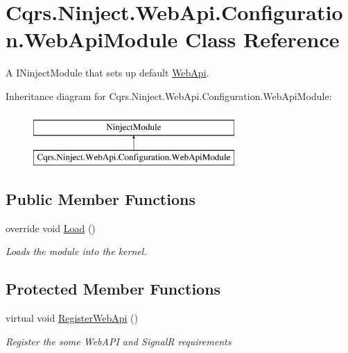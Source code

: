 \hypertarget{classCqrs_1_1Ninject_1_1WebApi_1_1Configuration_1_1WebApiModule}{}\section{Cqrs.\+Ninject.\+Web\+Api.\+Configuration.\+Web\+Api\+Module Class Reference}
\label{classCqrs_1_1Ninject_1_1WebApi_1_1Configuration_1_1WebApiModule}


A I\+Ninject\+Module that sets up default \hyperlink{namespaceCqrs_1_1Ninject_1_1WebApi}{Web\+Api}.  


Inheritance diagram for Cqrs.\+Ninject.\+Web\+Api.\+Configuration.\+Web\+Api\+Module\+:\begin{figure}[H]
\begin{center}
\leavevmode
\includegraphics[height=2.000000cm]{classCqrs_1_1Ninject_1_1WebApi_1_1Configuration_1_1WebApiModule}
\end{center}
\end{figure}
\subsection*{Public Member Functions}
\begin{DoxyCompactItemize}
\item 
override void \hyperlink{classCqrs_1_1Ninject_1_1WebApi_1_1Configuration_1_1WebApiModule_aea07833aa64eebb9996d681102d6aacd_aea07833aa64eebb9996d681102d6aacd}{Load} ()
\begin{DoxyCompactList}\small\item\em Loads the module into the kernel. \end{DoxyCompactList}\end{DoxyCompactItemize}
\subsection*{Protected Member Functions}
\begin{DoxyCompactItemize}
\item 
virtual void \hyperlink{classCqrs_1_1Ninject_1_1WebApi_1_1Configuration_1_1WebApiModule_a6348f033ad2ec9300eb20bf0c763be1f_a6348f033ad2ec9300eb20bf0c763be1f}{Register\+Web\+Api} ()
\begin{DoxyCompactList}\small\item\em Register the some Web\+A\+PI and SignalR requirements \end{DoxyCompactList}\end{DoxyCompactItemize}


